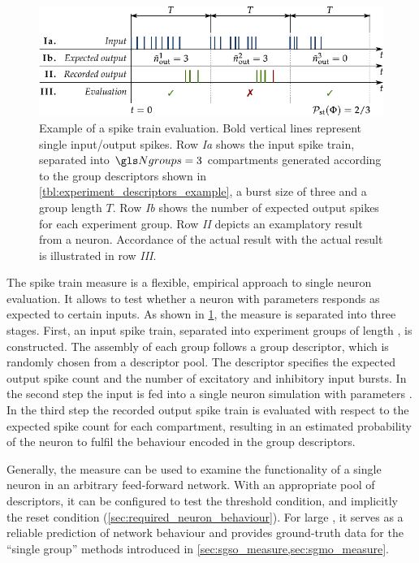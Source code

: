 \begin{figure}
	\centering
	\includegraphics{media/chp4/spike_train_measure_example.pdf}
	\caption[Example of a spike train evaluation]{Example of a spike train evaluation. Bold vertical lines represent single input/output spikes. Row \emph{Ia} shows the input spike train, separated into $\Ngroups = 3$ compartments generated according to the group descriptors shown in \vref{tbl:experiment_descriptors_example}, a burst size of three and a group length $T$. Row \emph{Ib} shows the number of expected output spikes for each experiment group. Row \emph{II} depicts an examplatory result from a neuron. Accordance of the actual result with the actual result is illustrated in row \emph{III}.}
	\label{fig:spike_train_measure_example}
\end{figure}

The spike train measure is a flexible, empirical approach to single neuron evaluation. It allows to test whether a neuron with parameters \nParams responds as expected to certain inputs. As shown in \cref{fig:spike_train_measure_example}, the measure is separated into three stages. First, an input spike train, separated into \Ngroups experiment groups of length \timeWindow, is constructed. The assembly of each group follows a group descriptor, which is randomly chosen from a descriptor pool. The descriptor specifies the expected output spike count and the number of excitatory and inhibitory input bursts. In the second step the input is fed into a single neuron simulation with parameters \nParams. In the third step the recorded output spike train is evaluated with respect to the expected spike count for each compartment, resulting in an estimated probability \PST of the neuron to fulfil the behaviour encoded in the group descriptors.

Generally, the measure can be used to examine the functionality of a single neuron in an arbitrary feed-forward network. With an appropriate pool of descriptors, it can be configured to test the \BiNAM threshold condition, and implicitly the reset condition (\cref{sec:required_neuron_behaviour}). For large \Ngroups, it serves as a reliable prediction of network behaviour and provides ground-truth data for the \enquote{single group} methods introduced in \cref{sec:sgso_measure,sec:sgmo_measure}.

